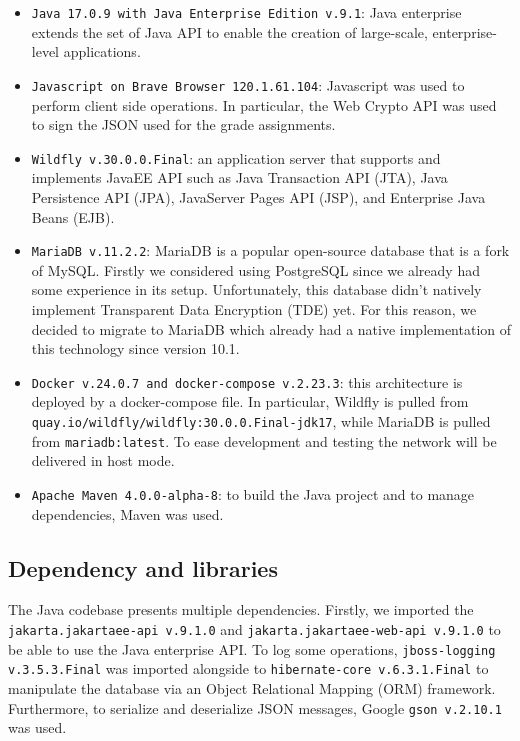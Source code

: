 \begin{itemize}
    \item \texttt{Java 17.0.9 with Java Enterprise Edition v.9.1}: Java enterprise extends the set of Java API to enable the creation of large-scale, enterprise-level applications.
    \item \texttt{Javascript on Brave Browser 120.1.61.104}: Javascript was used to perform client side operations. In particular, the Web Crypto API was used to sign the JSON used for the grade assignments.
    \item \texttt{Wildfly v.30.0.0.Final}: an application server that supports and implements JavaEE API such as Java Transaction API (JTA), Java Persistence API (JPA), JavaServer Pages API (JSP), and Enterprise Java Beans (EJB).
    \item \texttt{MariaDB v.11.2.2}: MariaDB is a popular open-source database that is a fork of MySQL. Firstly we considered using PostgreSQL since we already had some experience in its setup. Unfortunately, this database didn't natively implement Transparent Data Encryption (TDE) yet. For this reason, we decided to migrate to MariaDB which already had a native implementation of this technology since version 10.1.
    \item \texttt{Docker v.24.0.7 and docker-compose v.2.23.3}: this architecture is deployed by a docker-compose file. In particular, Wildfly is pulled from \texttt{quay.io/wildfly/wildfly:30.0.0.Final-jdk17}, while MariaDB is pulled from \texttt{mariadb:latest}. To ease development and testing the network will be delivered in host mode.
    \item \texttt{Apache Maven 4.0.0-alpha-8}: to build the Java project and to manage dependencies, Maven was used. 
\end{itemize}

\subsection*{Dependency and libraries}

The Java codebase presents multiple dependencies. Firstly, we imported the \texttt{jakarta.jakartaee-api v.9.1.0} and \texttt{jakarta.jakartaee-web-api v.9.1.0} to be able to use the Java enterprise API. To log some operations, \texttt{jboss-logging v.3.5.3.Final} was imported alongside to \texttt{hibernate-core v.6.3.1.Final} to manipulate the database via an Object Relational Mapping (ORM) framework. Furthermore, to serialize and deserialize JSON messages, Google \texttt{gson v.2.10.1} was used.

